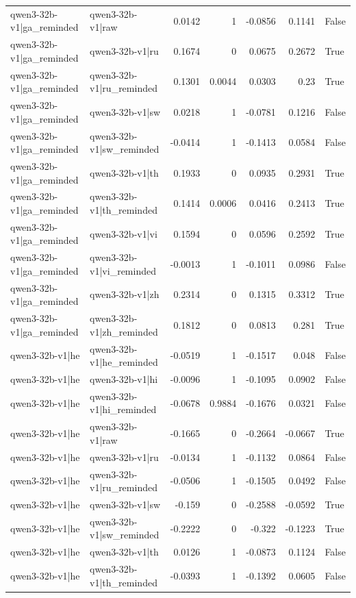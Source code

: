 \begin{table}
\begin{tabular}{l l r r r r l}
qwen3-32b-v1|ga_reminded & qwen3-32b-v1|raw & 0.0142 & 1 & -0.0856 & 0.1141 & False \\
qwen3-32b-v1|ga_reminded & qwen3-32b-v1|ru & 0.1674 & 0 & 0.0675 & 0.2672 & True \\
qwen3-32b-v1|ga_reminded & qwen3-32b-v1|ru_reminded & 0.1301 & 0.0044 & 0.0303 & 0.23 & True \\
qwen3-32b-v1|ga_reminded & qwen3-32b-v1|sw & 0.0218 & 1 & -0.0781 & 0.1216 & False \\
qwen3-32b-v1|ga_reminded & qwen3-32b-v1|sw_reminded & -0.0414 & 1 & -0.1413 & 0.0584 & False \\
qwen3-32b-v1|ga_reminded & qwen3-32b-v1|th & 0.1933 & 0 & 0.0935 & 0.2931 & True \\
qwen3-32b-v1|ga_reminded & qwen3-32b-v1|th_reminded & 0.1414 & 0.0006 & 0.0416 & 0.2413 & True \\
qwen3-32b-v1|ga_reminded & qwen3-32b-v1|vi & 0.1594 & 0 & 0.0596 & 0.2592 & True \\
qwen3-32b-v1|ga_reminded & qwen3-32b-v1|vi_reminded & -0.0013 & 1 & -0.1011 & 0.0986 & False \\
qwen3-32b-v1|ga_reminded & qwen3-32b-v1|zh & 0.2314 & 0 & 0.1315 & 0.3312 & True \\
qwen3-32b-v1|ga_reminded & qwen3-32b-v1|zh_reminded & 0.1812 & 0 & 0.0813 & 0.281 & True \\
qwen3-32b-v1|he & qwen3-32b-v1|he_reminded & -0.0519 & 1 & -0.1517 & 0.048 & False \\
qwen3-32b-v1|he & qwen3-32b-v1|hi & -0.0096 & 1 & -0.1095 & 0.0902 & False \\
qwen3-32b-v1|he & qwen3-32b-v1|hi_reminded & -0.0678 & 0.9884 & -0.1676 & 0.0321 & False \\
qwen3-32b-v1|he & qwen3-32b-v1|raw & -0.1665 & 0 & -0.2664 & -0.0667 & True \\
qwen3-32b-v1|he & qwen3-32b-v1|ru & -0.0134 & 1 & -0.1132 & 0.0864 & False \\
qwen3-32b-v1|he & qwen3-32b-v1|ru_reminded & -0.0506 & 1 & -0.1505 & 0.0492 & False \\
qwen3-32b-v1|he & qwen3-32b-v1|sw & -0.159 & 0 & -0.2588 & -0.0592 & True \\
qwen3-32b-v1|he & qwen3-32b-v1|sw_reminded & -0.2222 & 0 & -0.322 & -0.1223 & True \\
qwen3-32b-v1|he & qwen3-32b-v1|th & 0.0126 & 1 & -0.0873 & 0.1124 & False \\
qwen3-32b-v1|he & qwen3-32b-v1|th_reminded & -0.0393 & 1 & -0.1392 & 0.0605 & False \\

\end{tabular}
\end{table}
